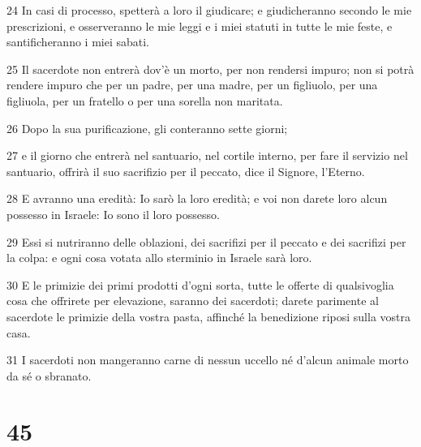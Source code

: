 \par 24 In casi di processo, spetterà a loro il giudicare; e giudicheranno secondo le mie prescrizioni, e osserveranno le mie leggi e i miei statuti in tutte le mie feste, e santificheranno i miei sabati.
\par 25 Il sacerdote non entrerà dov'è un morto, per non rendersi impuro; non si potrà rendere impuro che per un padre, per una madre, per un figliuolo, per una figliuola, per un fratello o per una sorella non maritata.
\par 26 Dopo la sua purificazione, gli conteranno sette giorni;
\par 27 e il giorno che entrerà nel santuario, nel cortile interno, per fare il servizio nel santuario, offrirà il suo sacrifizio per il peccato, dice il Signore, l'Eterno.
\par 28 E avranno una eredità: Io sarò la loro eredità; e voi non darete loro alcun possesso in Israele: Io sono il loro possesso.
\par 29 Essi si nutriranno delle oblazioni, dei sacrifizi per il peccato e dei sacrifizi per la colpa: e ogni cosa votata allo sterminio in Israele sarà loro.
\par 30 E le primizie dei primi prodotti d'ogni sorta, tutte le offerte di qualsivoglia cosa che offrirete per elevazione, saranno dei sacerdoti; darete parimente al sacerdote le primizie della vostra pasta, affinché la benedizione riposi sulla vostra casa.
\par 31 I sacerdoti non mangeranno carne di nessun uccello né d'alcun animale morto da sé o sbranato.

\chapter{45}

